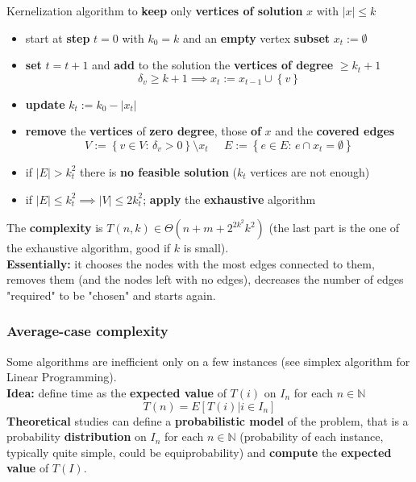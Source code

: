 \documentclass[11pt]{article}
\begin{document}
	Kernelization algorithm to \textbf{keep} only \textbf{vertices of solution} $x$ with $|x| \leq k$
	\begin{itemize}
		\item start at \textbf{step} $t = 0$ with $k_0 = k$ and an \textbf{empty} vertex \textbf{subset} $x_t := \emptyset$
		\item \textbf{set} $t = t + 1$ and \textbf{add} to the solution the \textbf{vertices of degree} $\geq k_t + 1$
		$$ \delta_v \geq k+1 \implies x_t := x_{t-1} \cup \left\{v\right\} $$
		\item \textbf{update} $k_t := k_0 − |x_t|$
		\item \textbf{remove} the \textbf{vertices} of \textbf{zero degree}, those \textbf{of} $x$ and the \textbf{covered edges}
		$$ V := \left\{v \in V : \, \delta_v > 0\right\} \setminus x_t \;\;\;\;\; E := \left\{e \in E : \, e \cap x_t = \emptyset \right\} $$
		\item if $|E| > k_t^2$ there is \textbf{no feasible solution} ($k_t$ vertices are not enough)
		\item if $|E| \leq k_t^2 \implies |V| \leq 2k_t^2$; \textbf{apply} the \textbf{exhaustive} algorithm
	\end{itemize}
	The \textbf{complexity} is $T(n,k) \in \Theta \left(n + m + 2^{2k^2}k^2 \right)$ (the last part is the one of the exhaustive algorithm, good if $k$ is small).\\
	
	\textbf{Essentially:} it chooses the nodes with the most edges connected to them, removes them (and the nodes left with no edges), decreases the number of edges "required" to be "chosen" and starts again.\\
	
	\newpage
	
	\subsubsection{Average-case complexity}
	Some algorithms are inefficient only on a few instances (see simplex algorithm for Linear Programming).\\
	
	\textbf{Idea:} define time as the \textbf{expected value} of $T(i)$ on $I_n$ for each $n \in \mathbb{N}$
	$$ T(n) = E \left[T(i) | i \in I_n \right]$$
	\textbf{Theoretical} studies can define a \textbf{probabilistic model} of the problem, that is a probability \textbf{distribution} on $I_n$ for each $n \in \mathbb{N}$ (probability of each instance, typically quite simple, could be equiprobability) and \textbf{compute} the \textbf{expected value} of $T(I)$.\\
	
\end{document}
